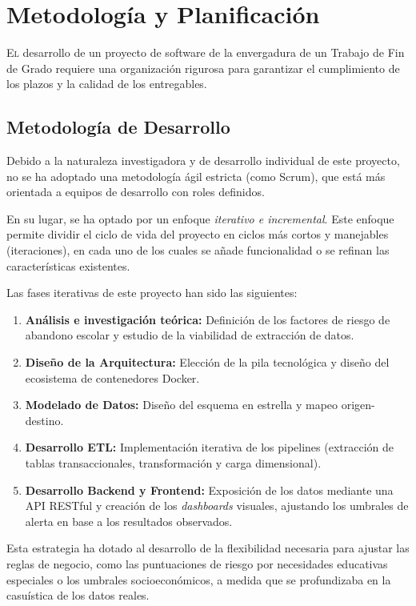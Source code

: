 \chapter{Metodología y Planificación}
\label{chap:metodologia}

\lettrine{E}{l} desarrollo de un proyecto de software de la envergadura de un Trabajo de Fin de Grado requiere una organización rigurosa para garantizar el cumplimiento de los plazos y la calidad de los entregables. 

\section{Metodología de Desarrollo}
Debido a la naturaleza investigadora y de desarrollo individual de este proyecto, no se ha adoptado una metodología ágil estricta (como Scrum), que está más orientada a equipos de desarrollo con roles definidos. 

En su lugar, se ha optado por un enfoque \textit{iterativo e incremental}. Este enfoque permite dividir el ciclo de vida del proyecto en ciclos más cortos y manejables (iteraciones), en cada uno de los cuales se añade funcionalidad o se refinan las características existentes.

Las fases iterativas de este proyecto han sido las siguientes:
\begin{enumerate}
    \item \textbf{Análisis e investigación teórica:} Definición de los factores de riesgo de abandono escolar y estudio de la viabilidad de extracción de datos.
    \item \textbf{Diseño de la Arquitectura:} Elección de la pila tecnológica y diseño del ecosistema de contenedores Docker.
    \item \textbf{Modelado de Datos:} Diseño del esquema en estrella y mapeo origen-destino.
    \item \textbf{Desarrollo ETL:} Implementación iterativa de los pipelines (extracción de tablas transaccionales, transformación y carga dimensional).
    \item \textbf{Desarrollo Backend y Frontend:} Exposición de los datos mediante una API RESTful y creación de los \textit{dashboards} visuales, ajustando los umbrales de alerta en base a los resultados observados.
\end{enumerate}

Esta estrategia ha dotado al desarrollo de la flexibilidad necesaria para ajustar las reglas de negocio, como las puntuaciones de riesgo por necesidades educativas especiales o los umbrales socioeconómicos, a medida que se profundizaba en la casuística de los datos reales.

